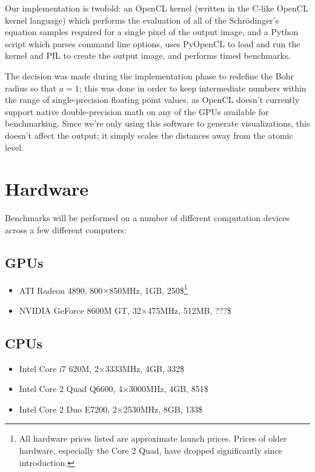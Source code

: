 \documentclass{acmsiggraph}
\begin{document}
Our implementation is twofold: an OpenCL kernel (written in the C-like OpenCL kernel language) which performs the evaluation of all of the Schr\"{o}dinger's equation samples required for a single pixel of the output image, and a Python script which parses command line options, uses PyOpenCL to load and run the kernel and PIL to create the output image, and performs timed benchmarks.

The decision was made during the implementation phase to redefine the Bohr radius so that $a=1$; this was done in order to keep intermediate numbers within the range of single-precision floating point values, as OpenCL doesn't currently support native double-precision math on any of the GPUs available for benchmarking. Since we're only using this software to generate visualizations, this doesn't affect the output; it simply scales the distances away from the atomic level.

\section{Hardware}

Benchmarks will be performed on a number of different computation devices across a few different computers:

\subsection{GPUs}

\begin{itemize}

\item ATI Radeon 4890, 800$\times$850MHz, 1GB, 250\$\footnote{All hardware prices listed are approximate launch prices. Prices of older hardware, especially the Core 2 Quad, have dropped significantly since introduction.\label{fn:prices}}

\item NVIDIA GeForce 8600M GT, 32$\times$475MHz, 512MB, ???\$

\end{itemize}

\subsection{CPUs}

\begin{itemize}

\item Intel Core i7 620M, 2$\times$3333MHz, 4GB, 332\$

\item Intel Core 2 Quad Q6600, 4$\times$3000MHz, 4GB, 851\$

\item Intel Core 2 Duo E7200, 2$\times$2530MHz, 8GB, 133\$

\end{itemize}
\end{document}
